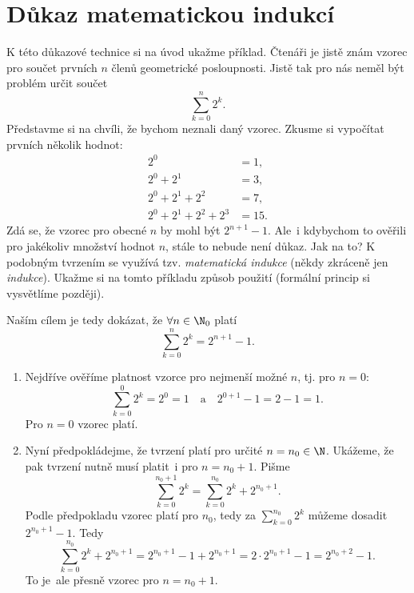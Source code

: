 \section{Důkaz matematickou indukcí}\label{sec:dukaz_indukci}
K této důkazové technice si na úvod ukažme příklad. Čtenáři je jistě znám vzorec pro součet prvních $n$ členů geometrické posloupnosti. Jistě tak pro nás neměl být problém určit součet
\begin{equation*}
    \sum_{k=0}^{n}{2^k}.
\end{equation*}
Představme si na chvíli, že bychom neznali daný vzorec. Zkusme si vypočítat prvních několik hodnot:
\begin{align*}
    2^0&=1,\\
    2^0+2^1&=3,\\
    2^0+2^1+2^2&=7,\\
    2^0+2^1+2^2+2^3&=15.
\end{align*}
Zdá se, že vzorec pro obecné $n$ by mohl být $2^{n+1}-1$. Ale~i kdybychom to ověřili pro jakékoliv množství hodnot $n$, stále to nebude není důkaz. Jak na to? K podobným tvrzením se využívá tzv. \emph{matematická indukce} (někdy zkráceně jen \emph{indukce}). Ukažme si na tomto příkladu způsob použití (formální princip si vysvětlíme později).\par
Naším cílem je tedy dokázat, že $\forall n\in\N_0$ platí
\begin{equation*}
    \sum_{k=0}^{n}{2^k}=2^{n+1}-1.
\end{equation*}
\begin{enumerate}[label=(\roman*)]
    \item\label{item:zaklad_indukce} Nejdříve ověříme platnost vzorce pro nejmenší možné $n$, tj. pro $n=0$:
    \begin{equation*}
        \sum_{k=0}^{0}{2^k}=2^0=1\quad\text{a}\quad2^{0+1}-1=2-1=1.
    \end{equation*}
    Pro $n=0$ vzorec platí.
    \item\label{item:indukcni_krok} Nyní předpokládejme, že tvrzení platí pro určité $n=n_0\in\N$. Ukážeme, že pak tvrzení nutně musí platit~i pro $n=n_0+1$. Pišme
    \begin{equation*}
        \sum_{k=0}^{n_0+1}{2^k}=\sum_{k=0}^{n_0}{2^k}+2^{n_0+1}.
    \end{equation*}
    Podle předpokladu vzorec platí pro $n_0$, tedy za $\sum_{k=0}^{n_0}{2^k}$ můžeme dosadit $2^{n_0+1}-1$. Tedy
    \begin{equation*}
        \sum_{k=0}^{n_0}{2^k}+2^{n_0+1}=2^{n_0+1}-1+2^{n_0+1}=2\cdot 2^{n_0+1}-1=2^{n_0+2}-1.
    \end{equation*}
    To je~ale přesně vzorec pro $n=n_0+1$.
\end{enumerate}

